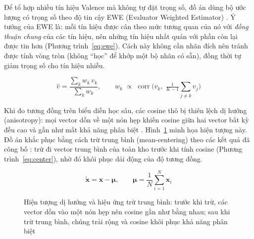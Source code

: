 \documentclass[../DoAn.tex]{subfiles}
\begin{document}
Để tổ hợp nhiều tín hiệu Valence mà không tự đặt trọng số, đồ án dùng bộ ước lượng có trọng số theo độ tin cậy EWE (Evaluator Weighted Estimator) \cite{grimm2005ewe}. Ý tưởng của EWE là: mỗi tín hiệu được cân theo mức tương quan của nó với \textit{đồng thuận chung} của các tín hiệu, nên những tín hiệu nhất quán với phần còn lại được tin hơn (Phương trình~\eqref{eq:ewe}). Cách này không cần nhãn đích nên tránh được tính vòng tròn (không ``học'' để khớp một bộ nhãn có sẵn), đồng thời tự giảm trọng số cho tín hiệu nhiễu.

\begin{equation}\label{eq:ewe}
  \hat{v} = \frac{\sum_{k} w_k\, v_k}{\sum_{k} w_k}, \qquad
  w_k \;\propto\; \operatorname{corr}\!\Big(v_k,\; \tfrac{1}{K-1}\textstyle\sum_{j\neq k} v_j\Big)
\end{equation}

Khi đo tương đồng trên biểu diễn học sâu, các cosine thô bị thiên lệch dị hướng (anisotropy): mọi vector dồn về một nón hẹp khiến cosine giữa hai vector bất kỳ đều cao và gần như mất khả năng phân biệt \cite{ethayarajh2019anisotropy}. Hình~\ref{fig:aniso} minh họa hiện tượng này. Đồ án khắc phục bằng cách trừ trung bình (mean-centering) theo các kết quả đã công bố \cite{mu2018allbutthetop}: trừ đi vector trung bình của toàn kho trước khi tính cosine (Phương trình~\eqref{eq:center}), nhờ đó khôi phục dải động của độ tương đồng.

\begin{equation}\label{eq:center}
  \tilde{\mathbf{x}} = \mathbf{x} - \boldsymbol{\mu}, \qquad
  \boldsymbol{\mu} = \frac{1}{N}\sum_{i=1}^{N}\mathbf{x}_i
\end{equation}

\begin{figure}[tbp]
\centering
{}
\caption{Hiện tượng dị hướng và hiệu ứng trừ trung bình: trước khi trừ, các vector dồn vào một nón hẹp nên cosine gần như bằng nhau; sau khi trừ trung bình, chúng trải rộng và cosine khôi phục khả năng phân biệt}
\label{fig:aniso}
\end{figure}
\end{document}
